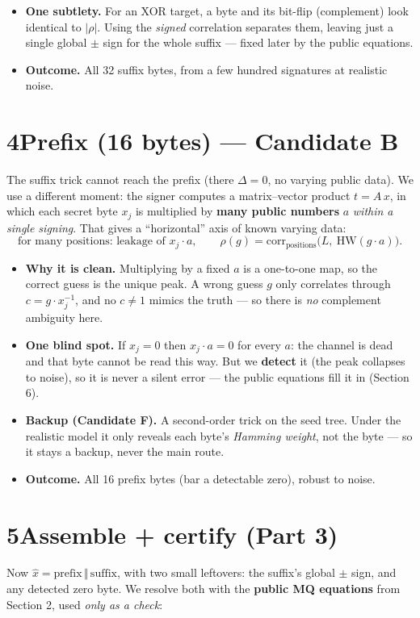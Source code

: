 \documentclass[11pt]{article}
\newcommand{\hw}{\mathrm{HW}}
\begin{document}
\begin{itemize}
\item \textbf{One subtlety.} For an XOR target, a byte and its bit-flip (complement) look
identical to $|\rho|$. Using the \emph{signed} correlation separates them, leaving just a
single global $\pm$ sign for the whole suffix --- fixed later by the public equations.
\item \textbf{Outcome.} All 32 suffix bytes, from a few hundred signatures at realistic noise.
\end{itemize}

\section*{4\quad Prefix (16 bytes) --- Candidate B}
The suffix trick cannot reach the prefix (there $\Delta=0$, no varying public data). We use a
different moment: the signer computes a matrix--vector product $t = A\,x$, in which each secret
byte $x_j$ is multiplied by \textbf{many public numbers} $a$ \emph{within a single signing}.
That gives a ``horizontal'' axis of known varying data:
\[
 \text{for many positions: leakage of } x_j\cdot a,\qquad
 \rho(g)=\mathrm{corr}_{\text{positions}}\big(L,\ \hw(g\cdot a)\big).
\]

\begin{itemize}
\item \textbf{Why it is clean.} Multiplying by a fixed $a$ is a one-to-one map, so the correct
guess is the unique peak. A wrong guess $g$ only correlates through $c=g\cdot x_j^{-1}$, and
no $c\neq 1$ mimics the truth --- so there is \emph{no} complement ambiguity here.
\item \textbf{One blind spot.} If $x_j=0$ then $x_j\cdot a=0$ for every $a$: the channel is
dead and that byte cannot be read this way. But we \textbf{detect} it (the peak collapses to
noise), so it is never a silent error --- the public equations fill it in (Section 6).
\item \textbf{Backup (Candidate F).} A second-order trick on the seed tree. Under the realistic
model it only reveals each byte's \emph{Hamming weight}, not the byte --- so it stays a backup,
never the main route.
\item \textbf{Outcome.} All 16 prefix bytes (bar a detectable zero), robust to noise.
\end{itemize}

\section*{5\quad Assemble + certify (Part 3)}
Now $\hat x = \text{prefix}\,\Vert\,\text{suffix}$, with two small leftovers: the suffix's
global $\pm$ sign, and any detected zero byte. We resolve both with the \textbf{public MQ
equations} from Section 2, used \emph{only as a check}:
\end{document}
